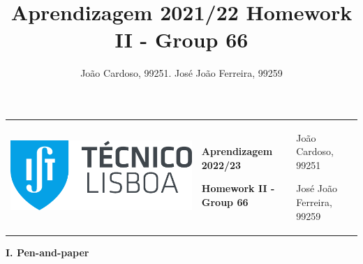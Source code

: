 \documentclass[11pt,a4paper]{article}
\title{Aprendizagem 2021/22 Homework II - Group 66}
\author{João Cardoso, 99251. José João Ferreira, 99259}
\begin{document}
\color{darkgray}
\hspace{-8.25mm}
\begin{tabularx}{1.09\textwidth} {>{\raggedright\arraybackslash}X >{\centering\arraybackslash}X >{\raggedleft\arraybackslash}X}
  \includegraphics[scale=0.2]{tecnico.pdf}                           &
  \textbf{Aprendizagem 2022/23} \par \textbf{Homework II - Group 66} &
  João Cardoso, 99251 \par José João Ferreira, 99259
\end{tabularx}
\color{black}

\begin{center}
  \textbf{I. Pen-and-paper}
\end{center}
\end{document}

